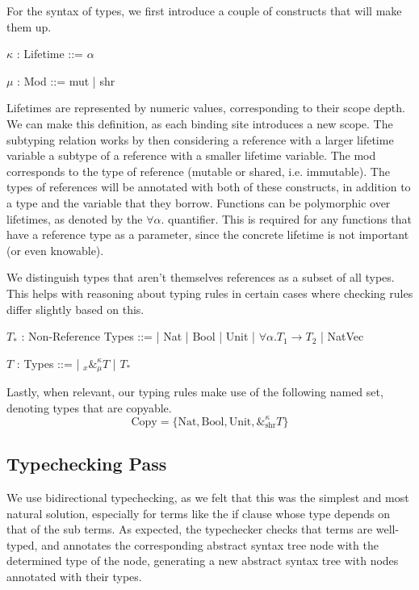 \documentclass[letterpaper,11pt]{article}
\begin{document}
For the syntax of types, we first introduce a couple of constructs that will make
them up.
\begin{center}
    \begin{bnf}
        $\kappa$ : \textsf{Lifetime} ::= $\alpha$
    \end{bnf}

    \begin{bnf}
        $\mu$ : \textsf{Mod} ::= mut | shr
    \end{bnf}
\end{center}
Lifetimes are represented by numeric values, corresponding to their scope depth.
We can make this definition, as each binding site introduces a new scope. The
subtyping relation works by then considering a reference with a larger lifetime variable a subtype
of a reference with a smaller lifetime variable. The mod corresponds to the type
of reference (mutable or shared, i.e. immutable). The types of references will be
annotated with both of these constructs, in addition to a type and the variable that they borrow.
Functions can be polymorphic over lifetimes, as denoted by the $\forall \alpha.$ quantifier. This is required for any functions
that have a reference type as a parameter, since the concrete lifetime is not important (or even knowable).

We distinguish types that aren't themselves references as a subset of all types.
This helps with reasoning about typing rules in certain cases where
checking rules differ slightly based on this.
\begin{center}
    \begin{bnf}
        $T_*$ : \textsf{Non-Reference Types} ::=
        | Nat | Bool | Unit | $\forall\alpha.T_1\rightarrow T_2$ | NatVec
    \end{bnf}
    
    \begin{bnf}
        $T$ : \textsf{Types} ::=
        | ${}_{x}\&^\kappa_\mu T$ | $T_*$
    \end{bnf}
\end{center}

Lastly, when relevant, our typing rules make use of the following named set,
denoting types that are copyable.
$$\text{Copy}=\{\text{Nat}, \text{Bool}, \text{Unit},\&^\kappa_{\text{shr}} T\}$$

\subsection{Typechecking Pass}
We use bidirectional typechecking, as we felt that this was the simplest and
most natural solution, especially for terms like the if clause whose type depends
on that of the sub terms. As expected, the typechecker checks that terms are
well-typed, and annotates the corresponding abstract syntax tree node with
the determined type of the node, generating a new abstract syntax tree with nodes
annotated with their types.
\end{document}
